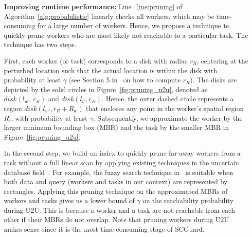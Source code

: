 \documentclass{USC-Thesis}
\newcommand{\SCG}{{SCGuard}}
\numberwithin{equation}{chapter}
\begin{document}
\textbf{Improving runtime performance:}
Line~\ref{line:pruning} of Algorithm~\ref{alg:probabilistic} linearly checks all workers, which may be time-consuming for a large number of workers. Hence, we propose a technique to quickly prune workers who are most likely not reachable to a particular task. The technique has two steps.

First, each worker (or task) corresponds to a disk with radius $r_R$, centering at the perturbed location such that the actual location is within the disk with probability at least $\gamma$ (see Section 5 in~\cite{andres2013geo} on how to compute $r_R$). The disks are depicted by the solid circles in Figure~\ref{fig:pruning_u2u}, denoted as $disk(l_{w'},r_R)$ and $disk(l_{t'},r_R)$. Hence, the outer dashed circle represents a region $disk(l_{w'},r_R+R_w)$ that encloses any point in the worker's spatial region $R_w$ with probability at least $\gamma$. Subsequently, we approximate the worker by the larger minimum bounding box (MBR) and the task by the smaller MBR in Figure~\ref{fig:pruning_u2u}.

In the second step, we build an index to quickly prune far-away workers from a task without a full linear scan by applying existing techniques in the uncertain database field~\cite{tao2007range,bernecker2011novel}. For example, the fuzzy search technique in~\cite{tao2007range} is suitable when both data and query (workers and tasks in our context) are represented by rectangles. Applying this pruning technique on the approximated MBRs of workers and tasks gives us a lower bound of $\gamma$ on the reachability probability during U2U. This is because a worker and a task are not reachable from each other if their MBRs do not overlap.
Note that pruning workers during U2U makes sense since it is the most time-consuming stage of \SCG. %

\end{document}

